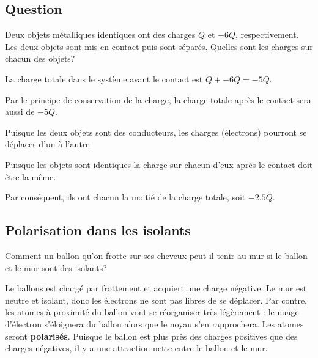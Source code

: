 \subsection*{Question}
Deux objets métalliques identiques ont des charges $Q$ et $-6Q$,
respectivement. Les deux objets sont mis en contact puis sont séparés. Quelles
sont les charges sur chacun des objets?

\vspace{0.3cm}
La charge totale dans le système avant le contact est $Q + -6Q = -5Q$.

Par le principe de conservation de la charge, la charge totale après le contact
sera aussi de $-5Q$.

Puisque les deux objets sont des conducteurs, les charges (électrons) pourront
se déplacer d'un à l'autre.

Puisque les objets sont identiques la charge sur chacun d'eux après le contact
doit être la même.

Par conséquent, ils ont chacun la
moitié de la charge totale, soit $-\num{2.5}Q$.


\subsection*{Polarisation dans les isolants}

Comment un ballon qu'on frotte sur ses cheveux peut-il tenir au mur si le
ballon et le mur sont des isolants?

Le ballons est chargé par frottement et acquiert une charge négative. Le mur
est neutre et isolant, donc les électrons ne sont pas libres de se déplacer.
Par contre, les atomes à proximité du ballon vont se réorganiser très
légèrement : le nuage d'électron s'éloignera du ballon alors que le noyau
s'en rapprochera. Les atomes seront \textbf{polarisés}. Puisque le ballon est
plus près des charges positives que des charges négatives, il y a une
attraction nette entre le ballon et le mur.

